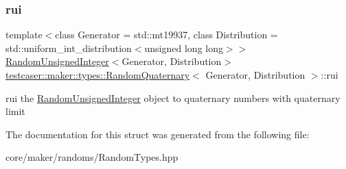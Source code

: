 \subsubsection{\texorpdfstring{rui}{rui}}
{\footnotesize\ttfamily template$<$class Generator = std\+::mt19937, class Distribution = std\+::uniform\+\_\+int\+\_\+distribution$<$unsigned long long$>$$>$ \\
\mbox{\hyperlink{classtestcaser_1_1maker_1_1types_1_1RandomUnsignedInteger}{Random\+Unsigned\+Integer}}$<$Generator, Distribution$>$ \mbox{\hyperlink{structtestcaser_1_1maker_1_1types_1_1RandomQuaternary}{testcaser\+::maker\+::types\+::\+Random\+Quaternary}}$<$ Generator, Distribution $>$\+::rui}



rui the \mbox{\hyperlink{classtestcaser_1_1maker_1_1types_1_1RandomUnsignedInteger}{Random\+Unsigned\+Integer}} object to quaternary numbers with quaternary limit 



The documentation for this struct was generated from the following file\+:\begin{DoxyCompactItemize}
\item 
core/maker/randoms/Random\+Types.\+hpp\end{DoxyCompactItemize}
